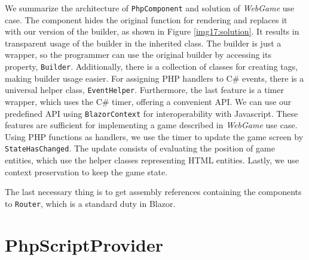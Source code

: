 \par
We summarize the architecture of \texttt{PhpComponent} and solution of \textit{WebGame} use case.
The component hides the original function for rendering and replaces it with our version of the builder, as shown in Figure \ref{img17:solution}.
It results in transparent usage of the builder in the inherited class.
The builder is just a wrapper, so the programmer can use the original builder by accessing its property, \texttt{Builder}.
Additionally, there is a collection of classes for creating tags, making builder usage easier.
For assigning PHP handlers to C\# events, there is a universal helper class, \texttt{EventHelper}.
Furthermore, the last feature is a timer wrapper, which uses the C\# timer, offering a convenient API.
We can use our predefined API using \texttt{BlazorContext} for interoperability with Javascript.
These features are sufficient for implementing a game described in \textit{WebGame} use case.
Using PHP functions as handlers, we use the timer to update the game screen by \texttt{StateHasChanged}.
The update consists of evaluating the position of game entities, which use the helper classes representing HTML entities.
Lastly, we use context preservation to keep the game state.
\par
The last necessary thing is to get assembly references containing the components to \texttt{Router}, which is a standard duty in Blazor.

\section{PhpScriptProvider}

